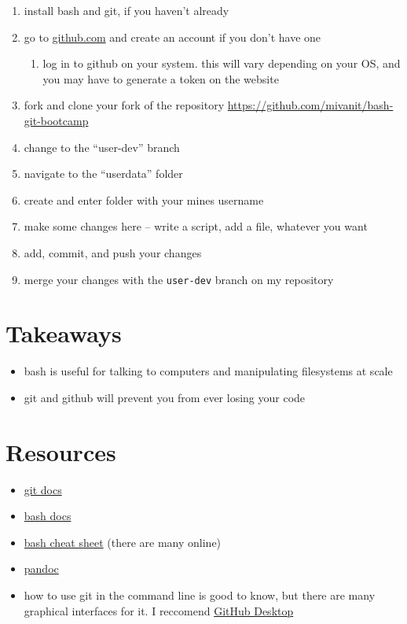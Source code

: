 \documentclass[
]{article}
\providecommand{\tightlist}{%
  \setlength{\itemsep}{0pt}\setlength{\parskip}{0pt}}
\begin{document}
\begin{enumerate}
\def\labelenumi{\arabic{enumi}.}
\tightlist
\item
  install bash and git, if you haven't already
\item
  go to \href{https://github.com}{github.com} and create an account if
  you don't have one

  \begin{enumerate}
  \def\labelenumii{\arabic{enumii}.}
  \setcounter{enumii}{2}
  \tightlist
  \item
    log in to github on your system. this will vary depending on your
    OS, and you may have to generate a token on the website
  \end{enumerate}
\item
  fork and clone your fork of the repository
  \url{https://github.com/mivanit/bash-git-bootcamp}
\item
  change to the ``user-dev'' branch
\item
  navigate to the ``userdata'' folder
\item
  create and enter folder with your mines username
\item
  make some changes here -- write a script, add a file, whatever you
  want
\item
  add, commit, and push your changes
\item
  merge your changes with the \texttt{user-dev} branch on my repository
\end{enumerate}

\hypertarget{takeaways}{%
\section{Takeaways}\label{takeaways}}

\begin{itemize}
\tightlist
\item
  bash is useful for talking to computers and manipulating filesystems
  at scale
\item
  git and github will prevent you from ever losing your code
\end{itemize}

\hypertarget{resources}{%
\section{Resources}\label{resources}}

\begin{itemize}
\tightlist
\item
  \href{https://git-scm.com/doc}{git docs}
\item
  \href{https://devdocs.io/bash/}{bash docs}
\item
  \href{https://oit.ua.edu/wp-content/uploads/2020/12/Linux_bash_cheat_sheet-1.pdf}{bash
  cheat sheet} (there are many online)
\item
  \href{https://pandoc.org/MANUAL.html}{pandoc}
\item
  how to use git in the command line is good to know, but there are many
  graphical interfaces for it. I reccomend
  \href{https://desktop.github.com}{GitHub Desktop}
\end{itemize}

\printbibliography
\end{document}
